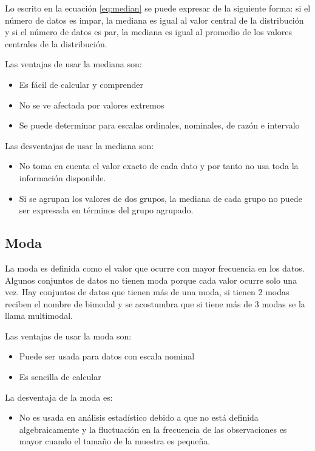 \documentclass[]{book}
\providecommand{\tightlist}{%
  \setlength{\itemsep}{0pt}\setlength{\parskip}{0pt}}
\begin{document}
Lo escrito en la ecuación \eqref{eq:median} se puede expresar de la siguiente forma: si el número de datos es impar, la mediana es igual al valor central de la distribución y si el número de datos es par, la mediana es igual al promedio de los valores centrales de la distribución.

Las ventajas de usar la mediana son:

\begin{itemize}
\tightlist
\item
  Es fácil de calcular y comprender
\item
  No se ve afectada por valores extremos
\item
  Se puede determinar para escalas ordinales, nominales, de razón e intervalo
\end{itemize}

Las desventajas de usar la mediana son:

\begin{itemize}
\tightlist
\item
  No toma en cuenta el valor exacto de cada dato y por tanto no usa toda la información disponible.
\item
  Si se agrupan los valores de dos grupos, la mediana de cada grupo no puede ser expresada en términos del grupo agrupado.
\end{itemize}

\hypertarget{moda}{%
\subsection{Moda}\label{moda}}

La moda es definida como el valor que ocurre con mayor frecuencia en los datos. Algunos conjuntos de datos no tienen moda porque cada valor ocurre solo una vez. Hay conjuntos de datos que tienen más de una moda, si tienen 2 modas reciben el nombre de bimodal y se acostumbra que si tiene más de 3 modas se la llama multimodal.

Las ventajas de usar la moda son:

\begin{itemize}
\tightlist
\item
  Puede ser usada para datos con escala nominal
\item
  Es sencilla de calcular
\end{itemize}

La desventaja de la moda es:

\begin{itemize}
\tightlist
\item
  No es usada en análisis estadístico debido a que no está definida algebraicamente y la fluctuación en la frecuencia de las observaciones es mayor cuando el tamaño de la muestra es pequeña.
\end{itemize}
\end{document}
